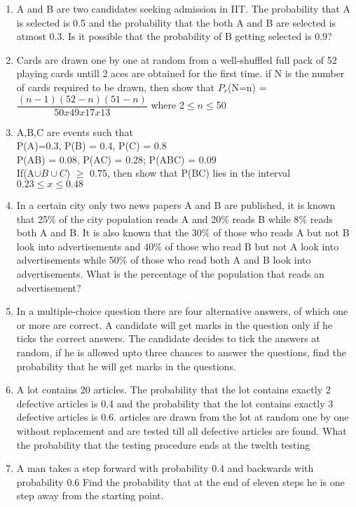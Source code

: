 \documentclass[journal,12pt,twocolumn]{IEEEtran}
\begin{document}
\begin{enumerate}[label=\arabic*]
	\item A and B are two candidates seeking admission in IIT. The probability that A is selected is 0.5 and the probability that the both A and B are selected is atmost 0.3. Is it possible that the probability of B getting selected is 0.9?\\
	\item Cards are drawn one by one at random from a well-shuffled full pack of 52 playing cards untill 2 aces are obtained for the first time. if N is the number of cards required to be drawn, then show that $P_r$(N=n) = $\dfrac{(n-1)(52-n)(51-n)}{50x49x17x13}$ where 2$\leq n \leq $50\\
	\item A,B,C are events such that\\
	 P(A)=0.3, P(B) = 0.4, P(C) = 0.8\\
	 P(AB) = 0.08, P(AC) = 0.28; P(ABC) = 0.09\\
	 If(A$\cup B \cup C$) $\geq$ 0.75, then show that P(BC) lies in the interval $0.23 \leq x \leq 0.48$\\
	 \item In a certain city only two news papers A and B are published, it is known that 25$\%$ of the city population reads A and 20$\%$ reads B while 8$\%$  reads both A and B. It is also known that the 30$\%$ of those who reads A but not B look into advertisements and 40$\%$  of those who read B but not A look into advertisements while 50$\%$ of those who read both A and B look into advertisements. What is the percentage of the population that reads an advertisement?\\
	 \item In a multiple-choice question there are four alternative answers, of which one or more are correct. A candidate will get marks in the question only if he ticks the correct  answers. The candidate decides to tick the answers at random, if he is allowed upto three chances to answer the questions, find the probability that he will get marks in the questions.\\
	 \item A lot contains 20 articles. The probability that the lot contains exactly 2 defective articles is 0.4 and the probability that the lot contains exactly 3 defective articles is 0.6. articles are drawn from the lot at random one by one without replacement and are tested till all defective articles are found. What the probability that the testing procedure ends at the twelth testing\\
	 \item A man takes a step forward with probability 0.4 and backwards with probability 0.6 Find the probability that at the end of eleven steps he is one step away from the starting point.\\

\end{enumerate}
\end{document}
